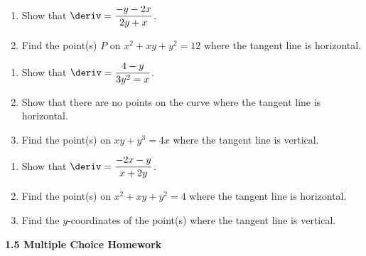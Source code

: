 \begin{enumerate}[label=\hspace{11pt}(\alph*), align=left, leftmargin=*, labelsep=0.25em]
    \item Show that $\deriv = \dfrac{-y - 2x}{2y + x}$.
    \item Find the point(s) $P$ on $x^2 + xy + y^2 = 12$ where the tangent line is horizontal.
\end{enumerate} \vspace{11pt}
 
\begin{enumerate}[label=\hspace{11pt}(\alph*), align=left, leftmargin=*, labelsep=0.25em]
    \item Show that $\deriv = \dfrac{4 - y}{3y^2 = x}$.
    \item Show that there are no points on the curve where the tangent line is horizontal.
    \item Find the point(s) on $xy + y^3 = 4x$ where the tangent line is vertical.
\end{enumerate} \vspace{11pt}

\begin{enumerate}[label=\hspace{11pt}(\alph*), align=left, leftmargin=*, labelsep=0.25em]
    \item Show that $\deriv = \dfrac{-2x - y}{x + 2y}$.
    \item Find the point(s) on $x^2 + xy + y^2 = 4$ where the tangent line is horizontal.
    \item Find the $y$-coordinates of the point(s) where the tangent line is vertical.
\end{enumerate} \vspace{11pt}

\textbf{\large{1.5 Multiple Choice Homework}} \par

